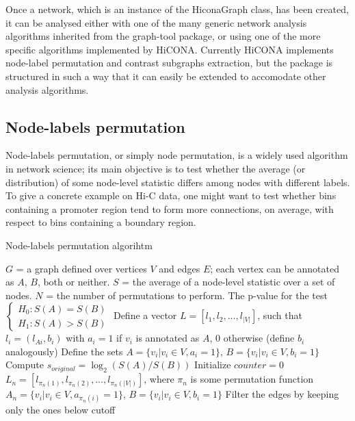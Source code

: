 Once a network, which is an instance of the HiconaGraph class, has been created, it can be analysed either with one of the many generic network analysis algorithms inherited from the graph-tool package, or using one of the more specific algorithms implemented by HiCONA. Currently HiCONA implements node-label permutation and contrast subgraphs extraction, but the package is structured in such a way that it can easily be extended to accomodate other analysis algorithms.

\subsection{Node-labels permutation}

Node-labels permutation, or simply node permutation, is a widely used algorithm in network science; its main objective is to test whether the average (or distribution) of some node-level statistic differs among nodes with different labels. To give a concrete example on Hi-C data, one might want to test whether bins containing a promoter region tend to form more connections, on average, with respect to bins containing a boundary region.

\begin{algorithm}
\caption{Node-labels permutation algorihtm}\label{alg:labelPermutations}
\begin{algorithmic}[1]
\Require $G$ = a graph defined over vertices $V$ and edges $E$; each vertex can be annotated as $A$, $B$, both or neither. $S$ = the average of a node-level statistic over a set of nodes. $N$ = the number of permutations to perform.
\Ensure The p-value for the test $\begin{cases} H_0: S(A) = S(B) \\ H_1: S(A) > S(B) \end{cases}$
\State Define a vector $L = \left[l_1, l_2, \dots, l_{|V|}\right]$, such that $l_i = (l_{Ai}, b_i)$ with $a_i = 1$ if $v_i$ is annotated as $A$, 0 otherwise (define $b_i$ analogously)
\State Define the sets $A = \{v_i | v_i \in V, a_i = 1\}$, $B = \{v_i | v_i \in V, b_i = 1\}$
\State Compute $s_{original} = \log_2(S(A)/S(B))$
\State Initialize $counter = 0$ 
    \State $L_n = [l_{\pi_n(1)}, l_{\pi_n(2)}, \dots, l_{\pi_n(|V|)}]$, where $\pi_n$ is some permutation function
    \State $A_n = \{v_i | v_i \in V, a_{\pi_n(i)} = 1\}$, $B = \{v_i | v_i \in V, b_i = 1\}$
\EndFor
\State Filter the edges by keeping only the ones below cutoff
\end{algorithmic}
\end{algorithm}

